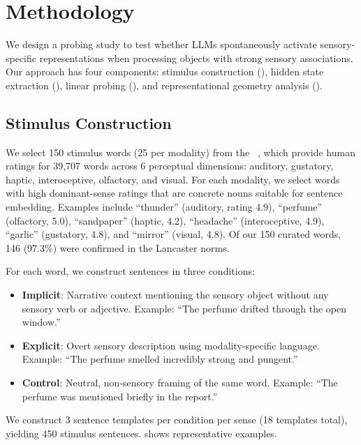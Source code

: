 \section{Methodology}
\label{sec:method}

We design a probing study to test whether LLMs spontaneously activate sensory-specific representations when processing objects with strong sensory associations. Our approach has four components: stimulus construction (), hidden state extraction (), linear probing (), and representational geometry analysis ().

\subsection{Stimulus Construction}
\label{sec:stimuli}

We select 150 stimulus words (25 per modality) from the \lancaster~\citep{lynott2020lancaster}, which provide human ratings for 39,707 words across 6 perceptual dimensions: auditory, gustatory, haptic, interoceptive, olfactory, and visual. For each modality, we select words with high dominant-sense ratings that are concrete nouns suitable for sentence embedding. Examples include ``thunder'' (auditory, rating 4.9), ``perfume'' (olfactory, 5.0), ``sandpaper'' (haptic, 4.2), ``headache'' (interoceptive, 4.9), ``garlic'' (gustatory, 4.8), and ``mirror'' (visual, 4.8). Of our 150 curated words, 146 (97.3\%) were confirmed in the Lancaster norms.

For each word, we construct sentences in three conditions:
\begin{itemize}[leftmargin=*,itemsep=2pt,topsep=2pt]
    \item \textbf{Implicit}: Narrative context mentioning the sensory object without any sensory verb or adjective. Example: ``The perfume drifted through the open window.''
    \item \textbf{Explicit}: Overt sensory description using modality-specific language. Example: ``The perfume smelled incredibly strong and pungent.''
    \item \textbf{Control}: Neutral, non-sensory framing of the same word. Example: ``The perfume was mentioned briefly in the report.''
\end{itemize}
We construct 3 sentence templates per condition per sense (18 templates total), yielding 450 stimulus sentences.  shows representative examples.

